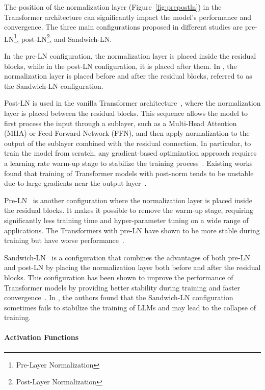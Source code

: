 The position of the normalization layer (Figure~\ref{fig:prepostln}) in the Transformer architecture can significantly impact the model's performance and convergence.
The three main configurations proposed in different studies are pre-LN\footnote{Pre-Layer Normalization}, post-LN\footnote{Post-Layer Normalization}, and Sandwich-LN\@.

In the pre-LN configuration, the normalization layer is placed inside the residual blocks, while in the post-LN configuration, it is placed after them.
In \textcite{ding2021cogview}, the normalization layer is placed before and after the residual blocks, referred to as the Sandwich-LN configuration.

Post-LN is used in the vanilla Transformer architecture~\cite{vaswani2023attention}, where the normalization layer is placed between the residual blocks.
This sequence allows the model to first process the input through a sublayer, such as a Multi-Head Attention (MHA) or Feed-Forward Network (FFN), and then apply normalization to the output of the sublayer combined with the residual connection.
In particular, to train the model from scratch, any gradient-based optimization approach requires a learning rate warm-up stage to stabilize the training process~\cite{vaswani2023attention}.
Existing works found that training of Transformer models with post-norm tends to be unstable due to large gradients near the output layer~\cite{xiong2020layer}.

Pre-LN~\cite{baevski2019adaptive} is another configuration where the normalization layer is placed inside the residual blocks.
It makes it possible to remove the warm-up stage, requiring significantly less training time and hyper-parameter tuning on a wide range of applications.
The Transformers with pre-LN have shown to be more stable during training but have worse performance~\cite{liu2020understanding}.

Sandwich-LN~\cite{ding2021cogview} is a configuration that combines the advantages of both pre-LN and post-LN by placing the normalization layer both before and after the residual blocks.
This configuration has been shown to improve the performance of Transformer models by providing better stability during training and faster convergence~\cite{ding2021cogview}.
In \textcite{zeng2022glm130b}, the authors found that the Sandwich-LN configuration sometimes fails to stabilize the training of LLMs and may lead to the collapse of training.

\paragraph{Activation Functions}
\label{subsubsec:activation-functions}

